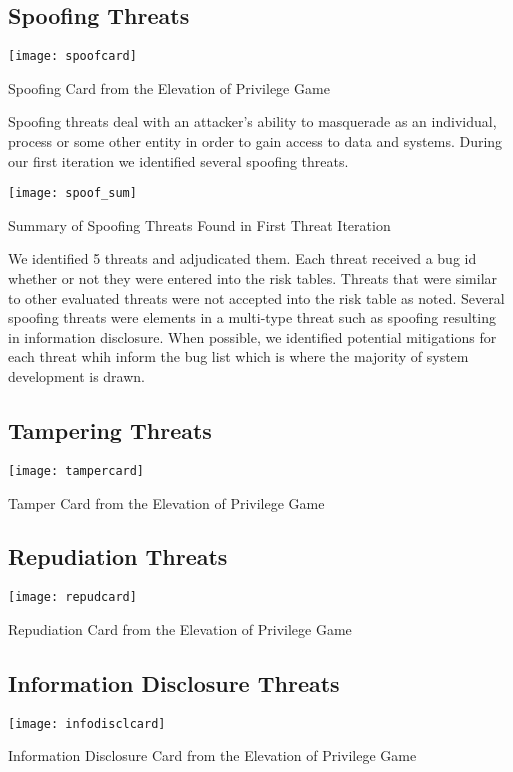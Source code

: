 \subsection{Spoofing Threats}
\begin{marginfigure}%
\centering
  \texttt{[image: spoofcard]}
  \caption{Spoofing Card from the Elevation of Privilege Game}
  \label{fig:spoofcard}
\end{marginfigure}
Spoofing threats deal with an attacker's ability to masquerade as an individual, process or some other entity in order to gain access to data and systems.  During our first iteration we identified several spoofing threats.

\begin{table*}[ht]
    \centering
    \texttt{[image: spoof\_sum]}
    \caption{Summary of Spoofing Threats Found in First Threat Iteration}
    \label{tab:spoofsum}
\end{table*}
We identified 5 threats and adjudicated them. Each threat received a bug id whether or not they were entered into the risk tables.  Threats that were similar to other evaluated threats were not accepted into the risk table as noted. Several spoofing threats were elements in a multi-type threat such as spoofing resulting in information disclosure. When possible, we identified potential mitigations for each threat whih inform the bug list which is where the majority of system development is drawn.

\subsection{Tampering Threats}
\begin{marginfigure}%
\centering
  \texttt{[image: tampercard]}
  \caption{Tamper Card from the Elevation of Privilege Game}
  \label{fig:tampercardcard}
\end{marginfigure}

\subsection{Repudiation Threats}
\begin{marginfigure}%
\centering
  \texttt{[image: repudcard]}
  \caption{Repudiation Card from the Elevation of Privilege Game}
  \label{fig:repudcard}
\end{marginfigure}

\subsection{Information Disclosure Threats}
\begin{marginfigure}%
\centering
  \texttt{[image: infodisclcard]}
  \caption{Information Disclosure Card from the Elevation of Privilege Game}
  \label{fig:spoofcard}
\end{marginfigure}

